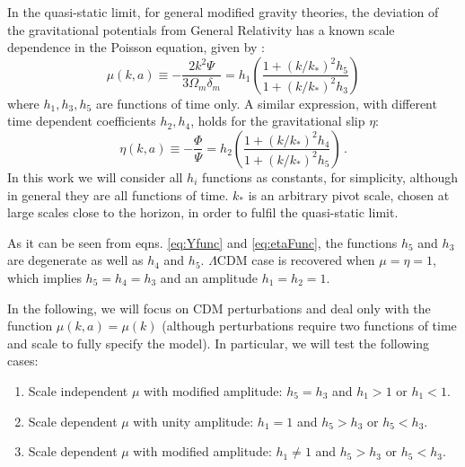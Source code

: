 In the quasi-static limit, for general modified gravity theories, the deviation
of the gravitational potentials from General Relativity has a known
scale dependence in the Poisson equation, given by \citep{...}: 
\begin{equation}
\mu(k,a)\equiv-\frac{2k^{2}\Psi}{3\Omega_{m}\delta_{m}}=h_{1}\left(\frac{1+(k/k_{*})^{2}h_{5}}{1+(k/k_{*})^{2}h_{3}}\right)\label{eq:Yfunc}
\end{equation}
where $h_{1},h_{3},h_{5}$ are functions of time only. A similar expression,
with different time dependent coefficients $h_{2},h_{4}$, holds for
the gravitational slip $\eta$: 
\begin{equation}
\eta(k,a)\equiv-\frac{\Phi}{\Psi}=h_{2}\left(\frac{1+(k/k_{*})^{2}h_{4}}{1+(k/k_{*})^{2}h_{5}}\right)\,.\label{eq:etaFunc}
\end{equation}
In this work we will consider all $h_{i}$ functions as constants,
for simplicity, although in general they are all functions of time.
$k_{*}$ is an arbitrary pivot scale, chosen at large scales close
to the horizon, in order to fulfil the quasi-static limit.

As it can be seen from eqns. \ref{eq:Yfunc} and \ref{eq:etaFunc},
the functions $h_{5}$ and $h_{3}$ are degenerate as well as $h_{4}$
and $h_{5}$. %
$\Lambda\textrm{CDM}$ case is recovered when $\mu=\eta=1$, which
implies $h_{5}=h_{4}=h_{3}$ and an amplitude $h_{1}=h_{2}=1$.

In the following, we will focus on CDM perturbations and deal only
with the function $\mu(k,a)=\mu(k)$ (although perturbations require
two functions of time and scale to fully specify the model). In particular,
we will test the following cases: 
\begin{enumerate}
	\item Scale independent $\mu$ with modified amplitude: $h_{5}=h_{3}$ and
	$h_{1}>1$ or $h_{1}<1$. 
	\item Scale dependent $\mu$ with unity amplitude: $h_{1}=1$ and $h_{5}>h_{3}$
	or $h_{5}<h_{3}$. 
	\item Scale dependent $\mu$ with modified amplitude: $h_{1}\neq1$ and
	$h_{5}>h_{3}\mbox{ or }h_{5}<h_{3}$. 
\end{enumerate}



